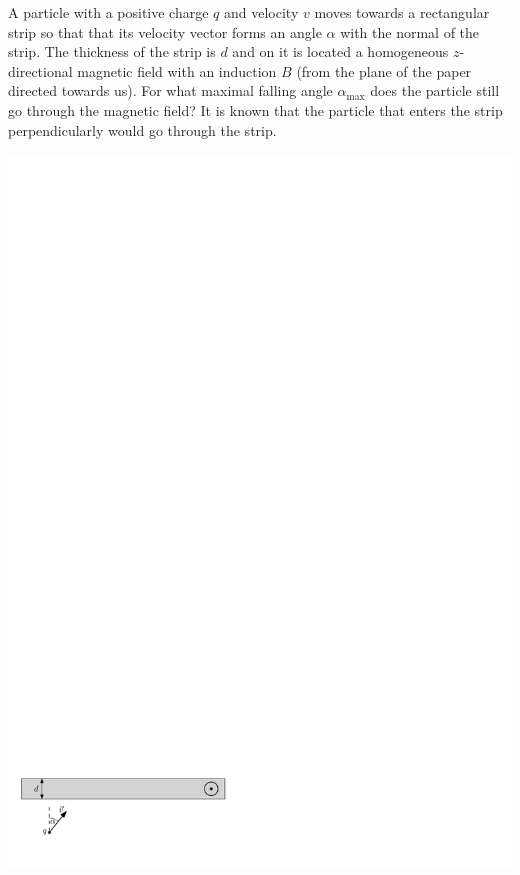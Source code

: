 \documentclass[11pt]{article}
\begin{document}
\probeng
A particle with a positive charge $q$ and velocity $v$ moves towards a rectangular strip so that that its velocity vector forms an angle $\alpha$ with the normal of the strip. The thickness of the strip is $d$ and on it is located a homogeneous $z$-directional magnetic field with an induction $B$ (from the plane of the paper directed towards us). For what maximal falling angle $\alpha_{\mathrm{max}}$ does the particle still go through the magnetic field? It is known that the particle that enters the strip perpendicularly would go through the strip.
\begin{center}
\includegraphics[width=\linewidth]{2013-lahg-02-magnetpeegeljoonis_ipe}
\end{center}
\probend
\bigskip

\end{document}
